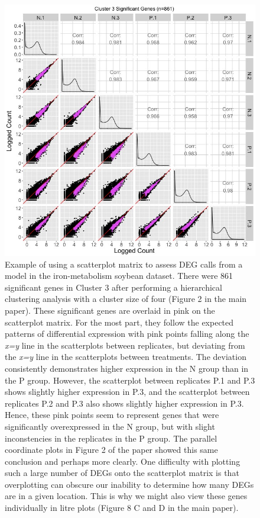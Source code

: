 \documentclass{article}
\begin{document}
  \null
  \begin{figure}[t!]
  \centerline{\includegraphics[width=\columnwidth]{../MakeFigures/sbIRClusterSigSM3.jpg}}
  \caption{Example of using a scatterplot matrix to assess DEG calls from a model in the iron-metabolism soybean dataset. There were 861 significant genes in Cluster 3 after performing a hierarchical clustering analysis with a cluster size of four (Figure 2 in the main paper). These significant genes are overlaid in pink on the scatterplot matrix. For the most part, they follow the expected patterns of differential expression with pink points falling along the \textit{x=y} line in the scatterplots between replicates, but deviating from the \textit{x=y} line in the scatterplots between treatments. The deviation consistently demonstrates higher expression in the N group than in the P group. However, the scatterplot between replicates P.1 and P.3 shows slightly higher expression in P.3, and the scatterplot between replicates P.2 and P.3 also shows slightly higher expression in P.3. Hence, these pink points seem to represent genes that were significantly overexpressed in the N group, but with slight inconstencies in the replicates in the P group. The parallel coordinate plots in Figure 2 of the paper showed this same conclusion and perhaps more clearly. One difficulty with plotting such a large number of DEGs onto the scatterplot matrix is that overplotting can obscure our inability to determine how many DEGs are in a given location. This is why we might also view these genes individually in litre plots (Figure 8 C and D in the main paper).
  \label{sbIRClusterSigSM3}}
  \end{figure}  
  
\end{document}
